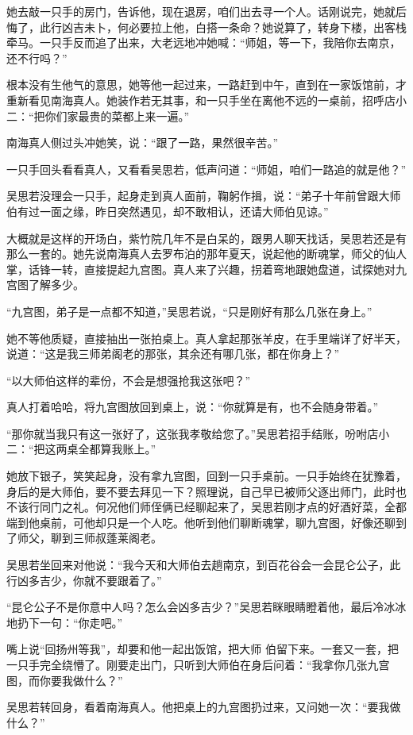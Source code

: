 她去敲一只手的房门，告诉他，现在退房，咱们出去寻一个人。话刚说完，她就后悔了，此行凶吉未卜，何必要拉上他，白搭一条命？她说算了，转身下楼，出客栈牵马。一只手反而追了出来，大老远地冲她喊：“师姐，等一下，我陪你去南京，还不行吗？”

根本没有生他气的意思，她等他一起过来，一路赶到中午，直到在一家饭馆前，才重新看见南海真人。她装作若无其事，和一只手坐在离他不远的一桌前，招呼店小二：“把你们家最贵的菜都上来一遍。”

南海真人侧过头冲她笑，说：“跟了一路，果然很辛苦。”

一只手回头看看真人，又看看吴思若，低声问道：“师姐，咱们一路追的就是他？”

吴思若没理会一只手，起身走到真人面前，鞠躬作揖，说：“弟子十年前曾跟大师伯有过一面之缘，昨日突然遇见，却不敢相认，还请大师伯见谅。”

大概就是这样的开场白，紫竹院几年不是白呆的，跟男人聊天找话，吴思若还是有那么一套的。她先说南海真人去罗布泊的那年夏天，说起他的断魂掌，师父的仙人掌，话锋一转，直接提起九宫图。真人来了兴趣，拐着弯地跟她盘道，试探她对九宫图了解多少。

“九宫图，弟子是一点都不知道，”吴思若说，“只是刚好有那么几张在身上。”

她不等他质疑，直接抽出一张拍桌上。真人拿起那张羊皮，在手里端详了好半天，说道：“这是我三师弟阁老的那张，其余还有哪几张，都在你身上？”

“以大师伯这样的辈份，不会是想强抢我这张吧？”

真人打着哈哈，将九宫图放回到桌上，说：“你就算是有，也不会随身带着。”

“那你就当我只有这一张好了，这张我孝敬给您了。”吴思若招手结账，吩咐店小二：“把这两桌全都算我账上。”

她放下银子，笑笑起身，没有拿九宫图，回到一只手桌前。一只手始终在犹豫着，身后的是大师伯，要不要去拜见一下？照理说，自己早已被师父逐出师门，此时也不该行同门之礼。何况他们师侄俩已经聊起来了，吴思若刚才点的好酒好菜，全都端到他桌前，可他却只是一个人吃。他听到他们聊断魂掌，聊九宫图，好像还聊到了师父，聊到三师叔蓬莱阁老。

吴思若坐回来对他说：“我今天和大师伯去趟南京，到百花谷会一会昆仑公子，此行凶多吉少，你就不要跟着了。”

“昆仑公子不是你意中人吗？怎么会凶多吉少？”吴思若眯眼睛瞪着他，最后冷冰冰地扔下一句：“你走吧。”

嘴上说“回扬州等我”，却要和他一起出饭馆，把大师
伯留下来。一套又一套，把一只手完全绕懵了。刚要走出门，只听到大师伯在身后问着：“我拿你几张九宫图，而你要我做什么？”

吴思若转回身，看着南海真人。他把桌上的九宫图扔过来，又问她一次：“要我做什么？”

